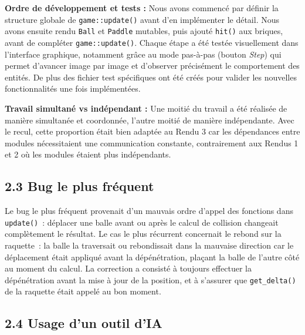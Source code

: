 \documentclass[10pt,a4paper]{article}
\begin{document}
\textbf{Ordre de développement et tests :}
Nous avons commencé par définir la structure globale de \texttt{game::update()} avant d'en
implémenter le détail. Nous avons ensuite rendu \texttt{Ball} et \texttt{Paddle} mutables, puis ajouté
\texttt{hit()} aux briques, avant de compléter \texttt{game::update()}. Chaque étape a été
testée visuellement dans l'interface graphique, notamment grâce au mode pas-à-pas (bouton
\textit{Step}) qui permet d'avancer image par image et d'observer précisément le comportement
des entités. De plus des fichier test spécifiques ont été créés pour valider les nouvelles fonctionnalités une fois implémentées.

\textbf{Travail simultané vs indépendant :}
Une moitié du travail a été réalisée de manière simultanée et coordonnée, l'autre moitié de
manière indépendante. Avec le recul, cette proportion était bien adaptée au Rendu 3 car les
dépendances entre modules nécessitaient une communication constante, contrairement aux
Rendus 1 et 2 où les modules étaient plus indépendants.

\subsection*{2.3 Bug le plus fréquent}

Le bug le plus fréquent provenait d'un mauvais ordre d'appel des fonctions dans
\texttt{update()}~: déplacer une balle avant ou après le calcul de collision changeait
complètement le résultat. Le cas le plus récurrent concernait le rebond sur la raquette~:
la balle la traversait ou rebondissait dans la mauvaise direction car le déplacement était
appliqué avant la dépénétration, plaçant la balle de l'autre côté au moment du calcul. La
correction a consisté à toujours effectuer la dépénétration avant la mise à jour de la
position, et à s'assurer que \texttt{get\_delta()} de la raquette était appelé au bon moment.

\subsection*{2.4 Usage d'un outil d'IA}
\end{document}
